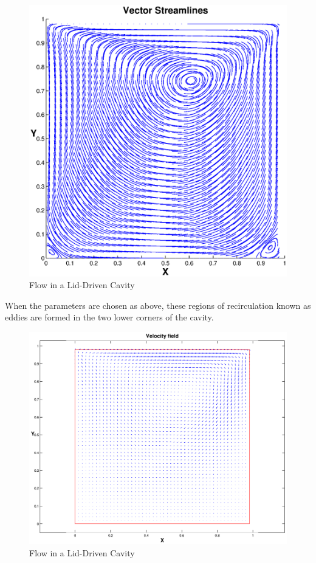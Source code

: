 \begin{figure}
\label{ldc1}
\begin{center}
\includegraphics[scale=.5]{dcavity.eps}
\end{center}
\caption{Flow in a Lid-Driven Cavity}
\end{figure}

When the parameters are chosen as above, these regions of recirculation known as eddies are formed in the two lower corners of the cavity. 

\begin{figure}
\label{ldc2}
\begin{center}
\includegraphics[scale = .3]{dcavity_velocityfield.eps}
\end{center}
\caption{Flow in a Lid-Driven Cavity}
\end{figure}

